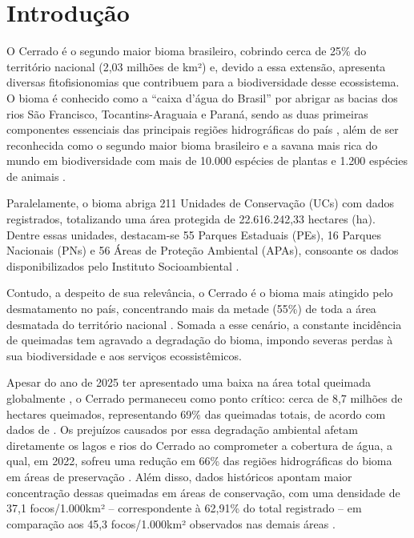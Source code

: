 
\chapter{Introdução}
\label{cap:intro}

O Cerrado é o segundo maior bioma brasileiro, cobrindo cerca de 25\% do território nacional (2,03 milhões de km²) e, devido a essa extensão, apresenta diversas fitofisionomias \cite{guarlado2023cerrado} que contribuem para a biodiversidade desse ecossistema. O bioma é conhecido como a ``caixa d'água do Brasil'' por abrigar as bacias dos rios São Francisco, Tocantins-Araguaia e Paraná, sendo as duas primeiras componentes essenciais das principais regiões
hidrográficas do país \cite{ana2015conjuntura}, além de ser reconhecida como o segundo maior bioma brasileiro e a savana mais rica do mundo em biodiversidade com mais de 10.000 espécies de plantas e 1.200 espécies de animais \cite{ibge2009biomas}.

Paralelamente, o bioma abriga 211 Unidades de Conservação (UCs) com dados registrados, totalizando uma área protegida de 22.616.242,33 hectares (ha). Dentre essas unidades, destacam-se 55 Parques Estaduais (PEs), 16 Parques Nacionais (PNs) e 56 Áreas de Proteção Ambiental (APAs), consoante os dados disponibilizados pelo Instituto Socioambiental \cite{isa_uc}.

Contudo, a despeito de sua relevância, o Cerrado é o bioma mais atingido pelo desmatamento no país, concentrando mais da metade (55\%) de toda a área desmatada do território nacional \cite{mapbiomas2026rad}. Somada a esse cenário, a constante incidência de queimadas tem agravado a degradação do bioma, impondo severas perdas à sua biodiversidade e aos serviços ecossistêmicos.

Apesar do ano de 2025 ter apresentado uma baixa na área total queimada globalmente \cite{burton2026wildfires}, o Cerrado permaneceu como ponto crítico: cerca de 8,7 milhões de hectares queimados, representando 69\% das queimadas totais, de acordo com dados de . Os prejuízos causados por essa degradação ambiental afetam diretamente os lagos e rios do Cerrado ao comprometer a cobertura de água, a qual, em 2022, sofreu uma redução em 66\% das regiões hidrográficas do bioma em áreas de preservação
\cite{guarlado2023cerrado}. Além disso, dados históricos apontam maior concentração dessas queimadas em áreas de conservação, com uma densidade de 37,1 focos/1.000km² -- correspondente à 62,91\% do total registrado -- em comparação aos 45,3 focos/1.000km² observados nas demais áreas \cite{vasconcelos2019analise}.

